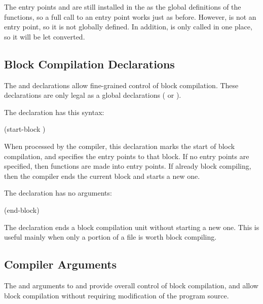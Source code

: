 The entry points  and  are still installed in
the  as the global definitions of the functions,
so a full call to an entry point works just as before.  However,
 is not an entry point, so it is not globally defined.  In
addition,  is only called in one place, so it will be let
converted.


\subsection{Block Compilation Declarations}

The  and 
declarations allow fine-grained control of block compilation.  These
declarations are only legal as a global declarations (
or ).

\noindent
\vspace{1 em}
The  declaration has this syntax:
\begin{example}
(start-block )
\end{example}
When processed by the compiler, this declaration marks the start of
block compilation, and specifies the entry points to that block.  If
no entry points are specified, then  functions are made into
entry points.  If already block compiling, then the compiler ends the
current block and starts a new one.

\noindent
\vspace{1 em}
The  declaration has no arguments:
\begin{lisp}
(end-block)
\end{lisp}
The  declaration ends a block compilation unit without
starting a new one.  This is useful mainly when only a portion of a file
is worth block compiling.


\subsection{Compiler Arguments}
\label{compile-file-block}

The  and  arguments to
 and  provide overall
control of block compilation, and allow block compilation without requiring
modification of the program source.

